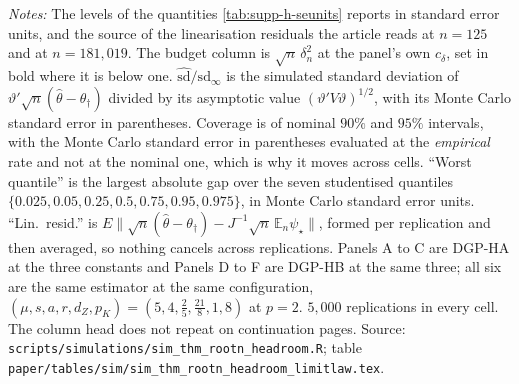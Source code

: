\documentclass[
  12pt]{article}
\newcommand{\1}[1]{\mathds{1}\left[#1\right]}
\theoremstyle{plain}
\theoremstyle{definition}
\theoremstyle{definition}
\theoremstyle{remark}
\begin{document}
\clearpage
\begingroup
\footnotesize
{}
\label{tab:supp-h-limitlaw}
\let\tabular\longtable
\let\endtabular\endlongtable

\addtocounter{table}{-1}
\endgroup
\begingroup\footnotesize
\textit{Notes:} The levels of the quantities \cref{tab:supp-h-seunits} reports in
standard error units, and the source of the linearisation residuals the article
reads at $n=125$ and at $n=181{,}019$. The budget column is $\sqrt n\,\delta_n^{2}$
at the panel's own $c_\delta$, set in bold where it is below one.
$\hat{\mathrm{sd}}/\mathrm{sd}_\infty$ is the simulated standard deviation of
$\vartheta'\sqrt n(\hat\theta-\theta_\dagger)$ divided by its asymptotic value
$(\vartheta'V\vartheta)^{1/2}$, with its Monte Carlo standard error in
parentheses. Coverage is of nominal $90\%$ and $95\%$ intervals, with the Monte
Carlo standard error in parentheses evaluated at the \emph{empirical} rate and
not at the nominal one, which is why it moves across cells. ``Worst quantile'' is
the largest absolute gap over the seven studentised quantiles
$\{0.025,0.05,0.25,0.5,0.75,0.95,0.975\}$, in Monte Carlo standard error units.
``Lin.\ resid.'' is
$E\|\sqrt n(\hat\theta-\theta_\dagger)-J^{-1}\sqrt n\,\mathbb E_n\psi_\star\|$,
formed per replication and then averaged, so nothing cancels across replications.
Panels A to C are DGP-HA at the three constants and Panels D to F are DGP-HB at
the same three; all six are the same estimator at the same configuration,
$(\mu,s,a,r,d_Z,p_K)=(5,4,\tfrac25,\tfrac{21}{8},1,8)$ at $p=2$. $5{,}000$
replications in every cell. The column head does not repeat on continuation
pages. Source: \texttt{scripts/simulations/sim\_thm\_rootn\_headroom.R}; table
\texttt{paper/tables/sim/sim\_thm\_rootn\_headroom\_limitlaw.tex}.
\par\endgroup
\clearpage
\end{document}
